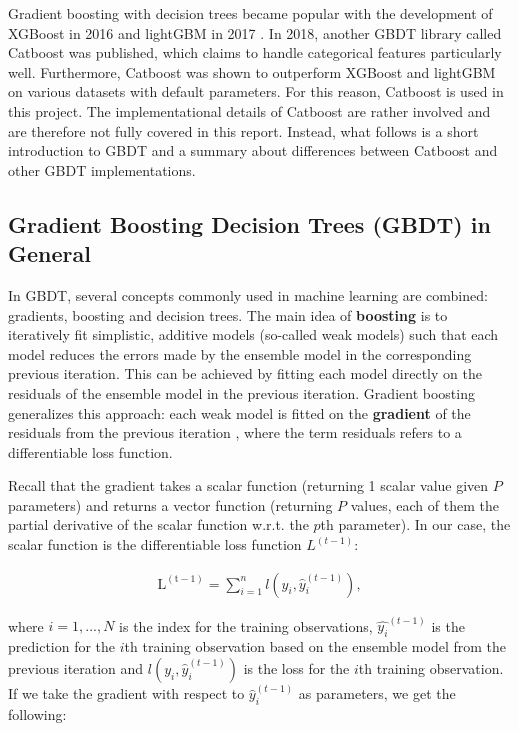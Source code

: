 \documentclass{article}
\begin{document}
	Gradient boosting with decision trees became popular with the development of XGBoost in 2016 \cite{chen_xgboost:_2016} and lightGBM in 2017 \cite{ke_lightgbm:_2017}. In 2018, another GBDT library called Catboost was published, which claims to handle categorical features particularly well. Furthermore, Catboost was shown to outperform XGBoost and lightGBM on various datasets with default parameters. For this reason, Catboost is used in this project. The implementational details of Catboost are rather involved and are therefore not fully covered in this report. Instead, what follows is a short introduction to GBDT and a summary about differences between Catboost and other GBDT implementations.

	\subsection{Gradient Boosting Decision Trees (GBDT) in General}
	
	In GBDT, several concepts commonly used in machine learning are combined: gradients, boosting and decision trees. The main idea of \textbf{boosting} is to iteratively fit simplistic, additive models (so-called weak models) such that each model reduces the errors made by the ensemble model in the corresponding previous iteration. This can be achieved by fitting each model directly on the residuals of the ensemble model in the previous iteration. Gradient boosting generalizes this approach: each weak model is fitted on the \textbf{gradient} of the residuals from the previous iteration  \cite{chen_xgboost:_2016} \cite{friedman_greedy_2001}  \cite{noauthor_kaggle_nodate}, where the term residuals refers to a differentiable loss function.
	
	Recall that the gradient takes a scalar function (returning 1 scalar value given $P$ parameters) and returns a vector function (returning $P$ values, each of them the partial derivative of the scalar function w.r.t. the $p$th parameter). In our case, the scalar function is the differentiable loss function $L^{(t-1)}$:

	\begin{align}
	\mathrm{L^{(t-1)}} = \sum_{i=1}^n l(y_i, \hat{y}_i^{(t-1)}), 
	\end{align} 
	
	where $i = 1, ..., N$ is the index for the training observations, $\hat{y_i}^{(t-1)}$ is the prediction for the $i$th training observation based on the ensemble model from the previous iteration and $l(y_i, \hat{y}_i^{(t-1)})$ is the loss for the $i$th training observation. If we take the gradient with respect to $\hat{y}_i^{(t-1)}$ as parameters, we get the following:
	
\end{document}
